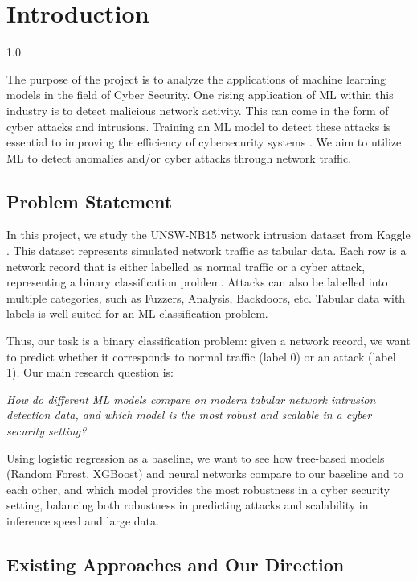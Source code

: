 \chapter{Introduction}
\begingroup
\setlength{\parskip}{0.2em}
\begin{spacing}{1.0}
\small

    The purpose of the project is to analyze the applications of machine learning models in the field
    of Cyber Security. One rising application of ML within this industry is to detect malicious network
    activity. This can come in the form of cyber attacks and intrusions. Training an ML model to
    detect these attacks is essential to improving the efficiency of cybersecurity systems \cite{ids_survey_ci}. We aim to utilize ML to detect anomalies and/or cyber attacks through network traffic.

\section{Problem Statement}
In this project, we study the UNSW-NB15 network intrusion dataset from
Kaggle \cite{kaggle_unsw_nb15}. This dataset represents simulated network traffic as tabular data.
Each row is a network record that is either labelled as normal traffic or a cyber attack, representing a binary 
classification problem. Attacks can also be labelled into multiple categories, such as Fuzzers, Analysis, Backdoors, etc.
Tabular data with labels is well suited for an ML classification problem.

Thus, our task is a binary classification problem: given a network record,
we want to predict whether it corresponds to normal traffic (label 0) or an attack
(label 1). Our main research question is:

\textit{How do different ML models compare on modern tabular network intrusion detection data, and which model is the most robust and scalable in a cyber security setting?}


Using logistic regression as a baseline, we want to see how tree-based models (Random Forest, 
XGBoost) and neural networks compare to our baseline and to each other, and which model provides the 
most robustness in a cyber security setting, balancing both robustness in predicting attacks and scalability in inference speed and large data.

\section{Existing Approaches and Our Direction}



\end{spacing}
